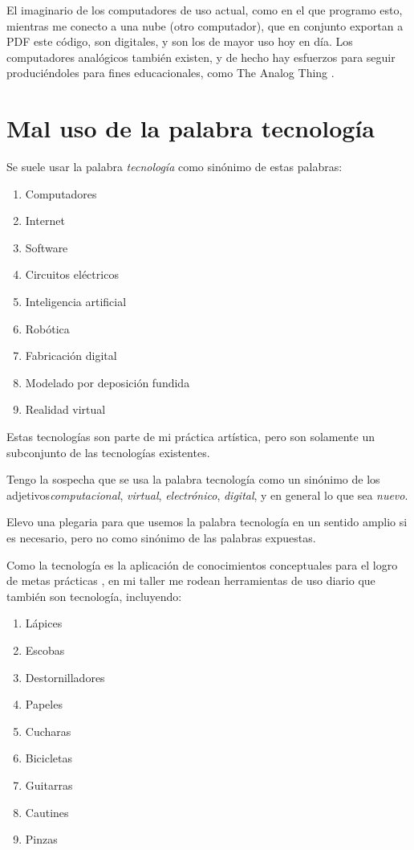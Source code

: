 \documentclass{article}
\begin{document}
El imaginario de los computadores de uso actual, como en el que programo esto, mientras me conecto a una nube (otro computador), que en conjunto exportan a PDF este código, son digitales, y son los de mayor uso hoy en día. Los computadores analógicos también existen, y de hecho hay esfuerzos para seguir produciéndoles para fines educacionales, como The Analog Thing \cite{analogThing}.

\clearpage

\section{Mal uso de la palabra tecnología}

Se suele usar la palabra \textit{tecnología} como sinónimo de estas palabras:

\begin{enumerate}
    \item Computadores
    \item Internet
    \item Software
    \item Circuitos eléctricos
    \item Inteligencia artificial
    \item Robótica
    \item Fabricación digital
    \item Modelado por deposición fundida
    \item Realidad virtual
\end{enumerate}

Estas tecnologías son parte de mi práctica artística, pero son solamente un subconjunto de las tecnologías existentes.

Tengo la sospecha que se usa la palabra tecnología como un sinónimo de los adjetivos\textit{computacional}, \textit{virtual}, \textit{electrónico}, \textit{digital}, y en general lo que sea \textit{nuevo}.

Elevo una plegaria para que usemos la palabra tecnología en un sentido amplio si es necesario, pero no como sinónimo de las palabras expuestas.

Como la tecnología es la aplicación de conocimientos conceptuales para el logro de metas prácticas \cite{technology}, en mi taller me rodean herramientas de uso diario que también son tecnología, incluyendo:

\begin{enumerate}
    \item Lápices
    \item Escobas
    \item Destornilladores
    \item Papeles
    \item Cucharas
    \item Bicicletas
    \item Guitarras
    \item Cautines
    \item Pinzas
\end{enumerate}
\end{document}
